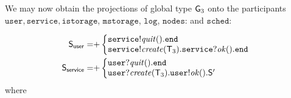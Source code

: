 We may now obtain the projections of global type ${\sf G}_3$ onto the participants $\mathtt{user}, \mathtt{service}, \mathtt{istorage}$, $\mathtt{mstorage}$, $\mathtt{log}$, $\mathtt{nodes}$: and $\mathtt{sched}$:

\begin{align*}
\hspace{-4mm}
\ST_\mathsf{user} = &
{+}
\left\{
\begin{array}{@{}l@{}}
\mathtt{service}{!}\mathit{quit}().\tend\\
\mathtt{service}{!}\mathit{create}(\T_3).\mathtt{service}{?}\mathit{ok}().\tend\\
\end{array} \right.\\
%
\hspace{-2mm}
\ST_\mathsf{service} = &
{+}
\left\{
\begin{array}{@{}l@{}}
\mathtt{user}{?}\mathit{quit}().\tend \\
\mathtt{user}{?}\mathit{create}(\T_3).\mathtt{user}{!}\mathit{ok}().\ST'\\
\end{array} \right.
\end{align*}
where
